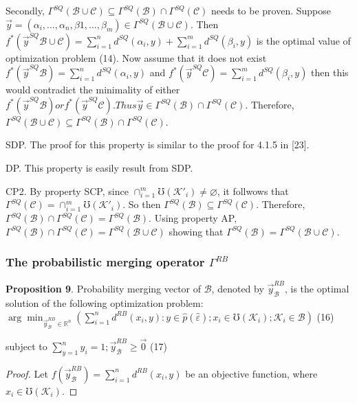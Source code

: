 \documentclass[]{iosart2c}
\begin{document}
  Secondly, $\Gamma^{SQ}(\mathcal{B} \cup \mathcal{C}) \subseteq \Gamma^{SQ}(\mathcal{B}) \cap \Gamma^{SQ}(\mathcal{C})$ needs to be proven. Suppose $\vec{y} = (\alpha_i, ..., \alpha_n, \beta1, ..., \beta_m) \in \Gamma^{SQ}(\mathcal{B} \cup \mathcal{C})$. Then $f^*(\vec{y}^{SQ}\mathcal{B}\cup\mathcal{C})=\sum^n_{i=1} d^{SQ} (\alpha_i, y) +\sum^m_{i=1} d^{SQ}(\beta_i, y)$ is the optimal value of optimization problem (14). Now assume that it does not exist $f^*(\vec{y}^{SQ}\mathcal{B} ) = \sum^n_{i=1} d^{SQ}(\alpha_i, y)$ and $f^*(\vec{y}^{SQ}\mathcal{C} ) = \sum^m_{i=1} d^{SQ}(\beta_i, y)$ then this would contradict the minimality of either $f^*(\vec{y}^{SQ}\mathcal{B} ) or f^*(\vec{y}^{SQ}\mathcal{C} ). Thus \vec{y} \in \Gamma^{SQ}(\mathcal{B}) \cap \Gamma^{SQ}(\mathcal{C})$. Therefore, $\Gamma^{SQ}(\mathcal{B} \cup \mathcal{C}) \subseteq \Gamma^{SQ}(\mathcal{B}) \cap \Gamma^{SQ}(\mathcal{C})$.

  SDP. The proof for this property is similar to the proof for 4.1.5 in [23].

  DP. This property is easily result from SDP.

  CP2. By property SCP, since $\cap^m_{i=1}\mho(\mathcal{K}'_i) \neq \varnothing$,
  it follwows that $\Gamma^{SQ}(\mathcal{C}) = \cap^m_{i=1}\mho(\mathcal{K}'_i)$. So then
  $\Gamma^{SQ}(\mathcal{B}) \subseteq \Gamma^{SQ}(\mathcal{C})$. Therefore, $\Gamma^{SQ}(\mathcal{B}) \cap \Gamma^{SQ}(\mathcal{C}) =
  \Gamma^{SQ}(\mathcal{B})$. Using property AP, $\Gamma^{SQ}(\mathcal{B}) \cap \Gamma^{SQ}(\mathcal{C}) = \Gamma^{SQ}(\mathcal{B} \cup \mathcal{C})$
  showing that $\Gamma^{SQ}(\mathcal{B}) = \Gamma^{SQ}(\mathcal{B} \cup \mathcal{C})$.

  \subsubsection{The probabilistic merging operator $\Gamma ^{RB}$}
  \textbf{Proposition 9}. Probability merging vector of $\mathcal{B}$,
  denoted by $\vec{y}^{RB}_\mathcal{B}$, is the optimal solution of the following optimization problem:
  $\arg \min_{\vec{y}^{RB}_\mathcal{B} \in \mathbb{R}^n} \left( \sum^n_{i=1} d^{RB}(x_i, y) :
  y \in \hat{p}(\hat{\varepsilon}); x_i \in \mho(\mathcal{K}_i);\mathcal{K}_i \in \mathcal{B} \right)$  (16)

  subject to $\sum^n_{y=1} y_i= 1; \vec{y}^{RB}_\mathcal{B} \geq \vec{0}$ (17)

  \begin{proof}
    Let $f(\vec{y}^{RB}_\mathcal{B}) = \sum^n_{i=1} d^{RB}(x_i,y)$ be an objective function, where $x_i \in \mho(\mathcal{K}_i)$.
  \end{proof}
\end{document}
